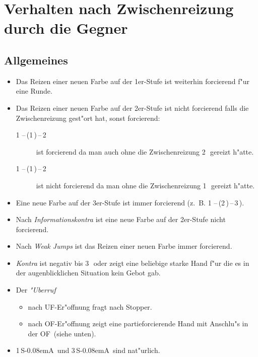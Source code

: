 \documentclass[11pt,german,twocolumn]{scrartcl}
\renewcommand{\Cl}{{\color{ClColor}{\clubs}}}
\renewcommand{\Di}{{\color{DiColor}{\sdiamonds}}}
\renewcommand{\He}{{\color{HeColor}{\shearts}}}
\renewcommand{\Sp}{{\color{SpColor}{\spades}}}
\def\pik{\,\Sp}
\def\coe{\,\He}
\def\kar{\,\Di}
\def\tre{\,\Cl}
\def\ufa{\textsf{UF}}
\def\ofa{\textsf{OF}}
\def\sa{\textsf{S\kern-0.08emA}}
\def\SA{\,\sa}
\def\sep{\,--\,}
\newcommand{\conv}[1]{\emph{#1}}
\begin{document}
\section{Verhalten nach Zwischenreizung durch die Gegner}

\subsection{Allgemeines}
\begin{itemize}
\item Das Reizen einer neuen Farbe auf der 1er-Stufe ist weiterhin
forcierend f"ur eine Runde.
%
\item Das Reizen einer neuen Farbe auf der 2er-Stufe ist nicht forcierend
falls die Zwischenreizung gest"ort hat, sonst forcierend:
\begin{description}
\item[1\coe\sep(1\pik)\sep2\kar] ist forcierend da man auch
ohne die Zwischenreizung 2\kar\ gereizt h"atte.
\item[1\tre\sep(1\pik)\sep2\coe] ist nicht forcierend da man ohne die
  Zwischenreizung 1\coe\ gereizt h"atte.
\end{description}
%
\item Eine neue Farbe auf der 3er-Stufe ist immer forcierend
  (z.~B. 1\pik\sep(2\kar)\sep3\tre).
\item Nach \conv{Informationskontra} ist eine neue Farbe auf der 2er-Stufe
  nicht forcierend.
\item Nach \conv{Weak Jumps} ist das Reizen einer neuen Farbe immer
  forcierend.
\item \conv{Kontra} ist negativ bis 3\coe\ oder zeigt eine beliebige
  starke Hand f"ur die es in der augenblicklichen Situation kein Gebot
  gab.
\item Der \conv{"Uberruf}
  \begin{itemize}
    \item nach \ufa-Er"offnung fragt nach Stopper.
    \item nach \ofa-Er"offnung zeigt eine partieforcierende Hand mit
      Anschlu"s in der \ofa\ (siehe unten).
    \end{itemize}
\item 1\SA\ und 3\SA\ sind nat"urlich.
\end{itemize}
\end{document}
